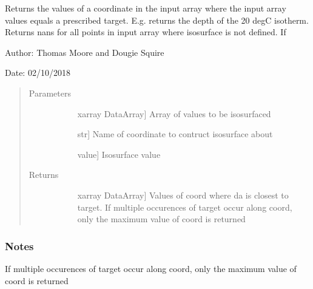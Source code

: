 \documentclass[letterpaper,10pt,english]{sphinxmanual}
\begin{document}
\begin{fulllineitems}
\label{\detokenize{utils_doc:utils.isosurface}}
Returns the values of a coordinate in the input array where the input array values equals                 a prescribed target. E.g. returns the depth of the 20 degC isotherm. Returns nans for all                 points in input array where isosurface is not defined. If

\begin{DUlineblock}{0em}
\item[] Author: Thomas Moore and Dougie Squire
\item[] Date: 02/10/2018
\end{DUlineblock}
\begin{quote}\begin{description}
\item[{Parameters}] \leavevmode\begin{description}
\item[{}] \leavevmode{[}xarray DataArray{]}
Array of values to be isosurfaced

\item[{}] \leavevmode{[}str{]}
Name of coordinate to contruct isosurface about

\item[{}] \leavevmode{[}value{]}
Isosurface value

\end{description}

\item[{Returns}] \leavevmode\begin{description}
\item[{}] \leavevmode{[}xarray DataArray{]}
Values of coord where da is closest to target. If multiple occurences of target occur                     along coord, only the maximum value of coord is returned

\end{description}

\end{description}\end{quote}
\subsubsection*{Notes}

If multiple occurences of target occur along coord, only the maximum value of coord is                returned


\end{fulllineitems}
\end{document}
